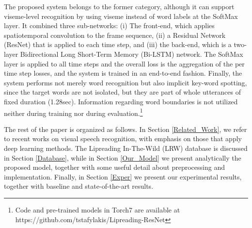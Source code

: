 \documentclass[a4paper]{article}
\begin{document}
The proposed system belongs to the former category, although it can support viseme-level recognition by using viseme instead of word labels at the SoftMax layer. It combined three sub-networks: (i) The front-end, which applies spatiotemporal convolution to the frame sequence, (ii) a Residual Network (ResNet) that is applied to each time step, and (iii) the back-end, which is a two-layer Bidirectional Long Short-Term Memory (Bi-LSTM) network. The SoftMax layer is applied to all time steps and the overall loss is the aggregation of the per time step losses, and the system is trained in an end-to-end fashion. Finally, the system performs not merely word recognition but also implicit key-word spotting, since the target words are not isolated, but they are part of whole utterances of fixed duration (1.28sec). Information regarding word boundaries is not utilized neither during training nor during evaluation.\footnote{Code and pre-trained models in Torch7 are available at https://github.com/tstafylakis/Lipreading-ResNet}

The rest of the paper is organized as follows. In Section \ref{Related_Work}, we refer to recent works on visual speech recognition, with emphasis on those that apply deep learning methods. The Lipreading In-The-Wild (LRW) database is discussed in Section \ref{Database}, while in Section \ref{Our_Model} we present analytically the proposed model, together with some useful detail about preprocessing and implementation. Finally, in Section \ref{Exper} we present our experimental results, together with baseline and state-of-the-art results.
\end{document}
